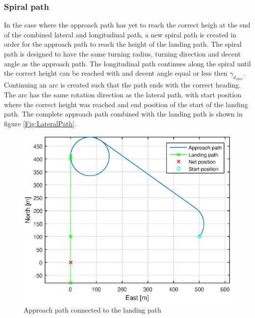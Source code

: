 \subsubsection{Spiral path}\label{pp:SpiralPath}
In the case where the approach path has yet to reach the correct heigh at the end of the combined lateral and longitudinal path, a new spiral path is created in order for the approach path to reach the height of the landing path. The spiral path is designed to have the same turning radius, turning direction and decent angle as the approach path. The longitudinal path continues along the spiral until the correct height can be reached with and decent angle equal or less then $\gamma_{d_{Max}}$. Continuing an arc is created such that the path ends with the correct heading. The arc has the same rotation direction as the lateral path, with start position where the correct height was reached and end position of the start of the landing path. The complete approach path combined with the landing path is shown in figure \ref{Fig:LateralPath}.
\begin{figure}[H]
	\centering
		\includegraphics[scale=0.7]{figs/SysPlot/LandingPath.eps}
		\caption{Approach path connected to the landing path}
		\label{Fig:LandingPath}
\end{figure}
